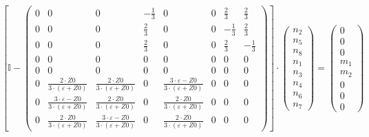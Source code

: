 \[ \left[ \mathbb{I}  - \left(\begin{array}{cccccccc} 0 & 0 & 0 & -\frac{1}{3} & 0 & 0 & \frac{2}{3} & \frac{2}{3} \\ 0 & 0 & 0 & \frac{2}{3} & 0 & 0 & -\frac{1}{3} & \frac{2}{3} \\ 0 & 0 & 0 & \frac{2}{3} & 0 & 0 & \frac{2}{3} & -\frac{1}{3} \\ 0 & 0 & 0 & 0 & 0 & 0 & 0 & 0 \\ 0 & 0 & 0 & 0 & 0 & 0 & 0 & 0 \\ 0 & \frac{2\cdot Z0}{3\cdot \left(\varepsilon+Z0\right)} & \frac{2\cdot Z0}{3\cdot \left(\varepsilon+Z0\right)} & 0 & \frac{3\cdot \varepsilon-Z0}{3\cdot \left(\varepsilon+Z0\right)} & 0 & 0 & 0 \\ 0 & \frac{3\cdot \varepsilon-Z0}{3\cdot \left(\varepsilon+Z0\right)} & \frac{2\cdot Z0}{3\cdot \left(\varepsilon+Z0\right)} & 0 & \frac{2\cdot Z0}{3\cdot \left(\varepsilon+Z0\right)} & 0 & 0 & 0 \\ 0 & \frac{2\cdot Z0}{3\cdot \left(\varepsilon+Z0\right)} & \frac{3\cdot \varepsilon-Z0}{3\cdot \left(\varepsilon+Z0\right)} & 0 & \frac{2\cdot Z0}{3\cdot \left(\varepsilon+Z0\right)} & 0 & 0 & 0 \end{array}\right)\right] \cdot \left(\begin{array}{c} n_{2} \\ n_{5} \\ n_{8} \\ n_{1} \\ n_{3} \\ n_{4} \\ n_{6} \\ n_{7} \end{array}\right) = \left(\begin{array}{c} 0 \\ 0 \\ 0 \\ m_{1} \\ m_{2} \\ 0 \\ 0 \\ 0 \end{array}\right) \]
